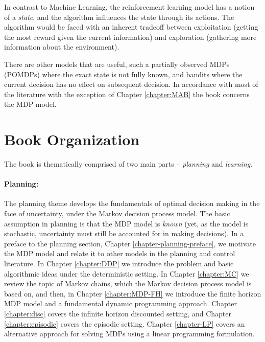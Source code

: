 In contrast to Machine Learning, the reinforcement learning model
 has a notion of a {\em state}, and the algorithm influences the state
through its actions.
The algorithm would be faced with an inherent tradeoff between
exploitation (getting the most reward given the current information)
and exploration (gathering more information about the environment).


There are other models that are useful, such a partially observed MDPs (POMDPs) where the exact state is not fully known, and bandits where the current decision has no effect on subsequent decision. In accordance with most of the literature with the exception of Chapter \ref{chapter:MAB} the book concerns the MDP model.


\section{Book Organization}

The book is thematically comprised of two main parts -- \textit{planning} and \textit{learning}. 

\paragraph{Planning:} The planning theme develops the fundamentals of optimal decision making in the face of uncertainty, under the Markov decision process model. The basic assumption in planning is that the MDP model is \textit{known} (yet, as the model is stochastic, uncertainty must still be accounted for in making decisions). In a preface to the planning section, Chapter \ref{chapter-planning-preface}, we motivate the MDP model and relate it to other models in the planning and control literature.
In Chapter \ref{chapter:DDP} we introduce the problem and basic algorithmic ideas under the deterministic setting. In Chapter \ref{chapter:MC} we review the topic of Markov chains, which the Markov decision process model is based on, and
then, in Chapter \ref{chapter:MDP-FH} we introduce the finite horizon MDP model and a fundamental dynamic programming approach. Chapter \ref{chapter:disc} covers the infinite horizon discounted setting, and Chapter \ref{chapter:episodic} covers the episodic setting. Chapter \ref{chapter-LP} covers an alternative approach for solving MDPs using a linear programming formulation.

